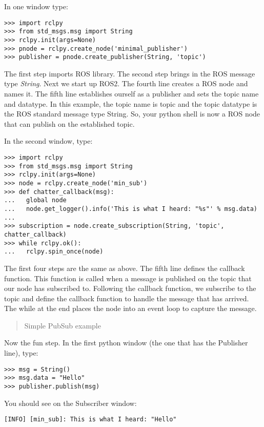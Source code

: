 In one window type:

\begin{verbatim}
>>> import rclpy
>>> from std_msgs.msg import String
>>> rclpy.init(args=None)
>>> pnode = rclpy.create_node('minimal_publisher')
>>> publisher = pnode.create_publisher(String, 'topic')
\end{verbatim}

The first step imports ROS library. The second step brings in the ROS
message type \emph{String}. Next we start up ROS2. The fourth line
creates a ROS node and names it. The fifth line establishes ourself as a
publisher and sets the topic name and datatype. In this example, the
topic name is {topic} and the topic datatype is the ROS standard message
type {String}. So, your python shell is now a ROS node that can publish
on the established topic.

In the second window, type:

\begin{verbatim}
>>> import rclpy
>>> from std_msgs.msg import String
>>> rclpy.init(args=None)
>>> node = rclpy.create_node('min_sub')
>>> def chatter_callback(msg):
...   global node
...   node.get_logger().info('This is what I heard: "%s"' % msg.data)
...
>>> subscription = node.create_subscription(String, 'topic', chatter_callback)
>>> while rclpy.ok():
...   rclpy.spin_once(node)
\end{verbatim}

The first four steps are the same as above. The fifth line defines the
callback function. This function is called when a message is published
on the topic that our node has subscribed to. Following the callback
function, we subscribe to the topic and define the callback function to
handle the message that has arrived. The while at the end places the
node into an event loop to capture the message.

\begin{quote}
Simple PubSub example
\end{quote}

Now the fun step. In the first python window (the one that has the
Publisher line), type:

\begin{verbatim}
>>> msg = String()
>>> msg.data = "Hello"
>>> publisher.publish(msg)
\end{verbatim}

You should see on the Subscriber window:

\begin{verbatim}
[INFO] [min_sub]: This is what I heard: "Hello"
\end{verbatim}

